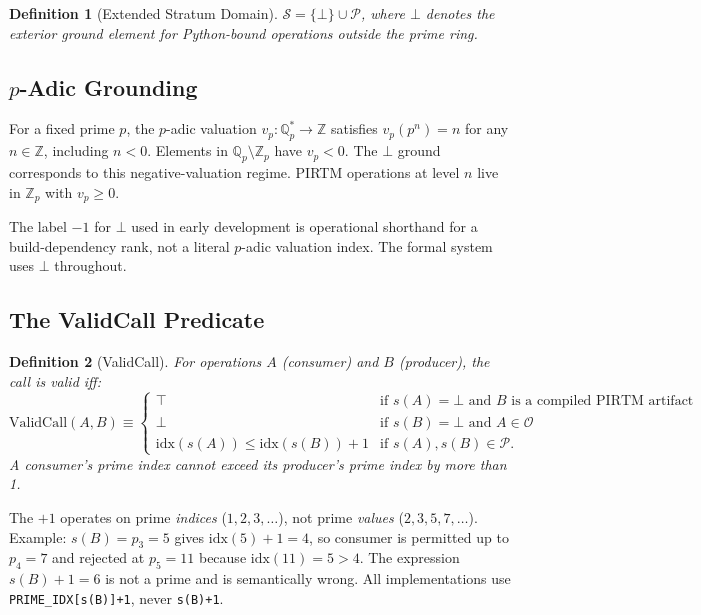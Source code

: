 \documentclass[11pt,letterpaper]{article}
\theoremstyle{pirtmthm}
\newtheorem{definition}{Definition}[section]
\theoremstyle{remark}
\begin{document}
\begin{definition}[Extended Stratum Domain]
$\mathcal{S} = \{\bot\} \cup \mathcal{P}$,
where $\bot$ denotes the exterior ground element for Python-bound operations
outside the prime ring.
\end{definition}

\subsection{\texorpdfstring{$p$}{p}-Adic Grounding}

For a fixed prime $p$, the $p$-adic valuation $v_p : \mathbb{Q}_p^* \to \mathbb{Z}$
satisfies $v_p(p^n) = n$ for any $n \in \mathbb{Z}$, including $n < 0$.
Elements in $\mathbb{Q}_p \setminus \mathbb{Z}_p$ have $v_p < 0$.
The $\bot$ ground corresponds to this negative-valuation regime.
PIRTM operations at level $n$ live in $\mathbb{Z}_p$ with $v_p \geq 0$.

\begin{warnbox}
The label $-1$ for $\bot$ used in early development is operational shorthand
for a build-dependency rank, not a literal $p$-adic valuation index.
The formal system uses $\bot$ throughout.
\end{warnbox}

\subsection{The ValidCall Predicate}

\begin{definition}[ValidCall]
For operations $A$ (consumer) and $B$ (producer), the call is valid iff:
\[
  \mathrm{ValidCall}(A, B) \equiv
  \begin{cases}
    \top
      & \text{if } s(A) = \bot \text{ and } B \text{ is a compiled PIRTM artifact}\\
    \bot
      & \text{if } s(B) = \bot \text{ and } A \in \mathcal{O}\\
    \mathrm{idx}(s(A)) \leq \mathrm{idx}(s(B)) + 1
      & \text{if } s(A), s(B) \in \mathcal{P}.
  \end{cases}
\]
\textit{A consumer's prime index cannot exceed its producer's prime index by more than 1.}
\end{definition}

\begin{warnbox}
The $+1$ operates on prime \emph{indices} ($1, 2, 3, \ldots$), not prime
\emph{values} ($2, 3, 5, 7, \ldots$).
Example: $s(B)=p_3=5$ gives $\mathrm{idx}(5)+1=4$, so consumer is permitted
up to $p_4=7$ and rejected at $p_5=11$ because $\mathrm{idx}(11)=5>4$.
The expression $s(B)+1=6$ is not a prime and is semantically wrong.
All implementations use \texttt{PRIME\_IDX[s(B)]+1}, never \texttt{s(B)+1}.
\end{warnbox}
\end{document}
